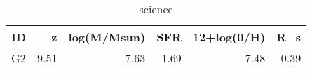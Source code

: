 \begin{table}[H]
\caption{science}
\label{science}
\begin{tabular}{lrrrrr}
\toprule
ID & z & log(M/Msun) & SFR & 12+log(0/H) & R_s \\
\midrule
G2 & 9.51 & 7.63 & 1.69 & 7.48 & 0.39 \\
\bottomrule
\end{tabular}
\end{table}
